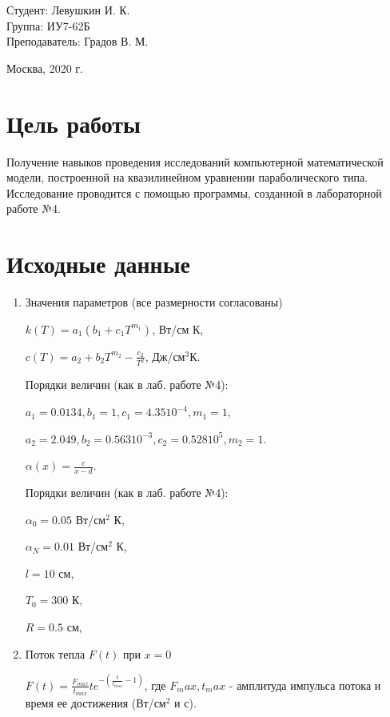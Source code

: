 \documentclass[a4paper,12pt]{article}
\begin{document}
	\large
	\begin{flushright}
		Студент: Левушкин И. К. \\
		Группа: ИУ7-62Б \\
		Преподаватель: Градов В. М. \\
	\end{flushright}
	
	\vspace*{25mm}
	\begin{center}
		Москва, 2020 г.  
	\end{center}
	\thispagestyle{empty}
	
	
	\newpage
	
	\section*{Цель работы}
	
	Получение навыков проведения исследований компьютерной математической модели, построенной на квазилинейном уравнении параболического типа.
	Исследование проводится  с помощью программы, созданной в лабораторной работе №4.
	
	\section*{Исходные данные}
	
	\begin{enumerate}
		\item Значения параметров (все размерности согласованы)
		
		$k(T) = a_1 (b_1 + c_1 T^{m_1})$, Вт/см К,
		
		$c(T) = a_2 + b_2 T^{m_2} - \frac{c_2}{T^2}$, Дж/см$^3$К.
		
		Порядки величин (как в лаб. работе №4):
		
		$a_1 = 0.0134, b_1 = 1, c_1 = 4.35 10^{-4}, m_1 = 1,$
		
		$a_2 = 2.049, b_2 = 0.563 10^{-3}, c_2 = 0.528 10^5, m_2 = 1.$
		
		$\alpha (x) = \frac{c}{x - d}$.
		
		Порядки величин (как в лаб. работе №4):
		
		$\alpha_0 = 0.05$ Вт/см$^2$ К,
		
		$\alpha_N = 0.01$ Вт/см$^2$ К,
		
		$l = 10$ см,
		
		$T_0 = 300$ К,
		
		$R = 0.5$ см,
		
		\item Поток тепла $F(t)$ при $x = 0$
		
		$F(t) = \frac{F_{max}}{t_{max}}t e^{-(\frac{t}{t_{max}} - 1)}$, где $F_max, t_max$ - амплитуда импульса потока и время ее достижения (Вт/см$^2$ и с).
		
	\end{enumerate}
\end{document}
